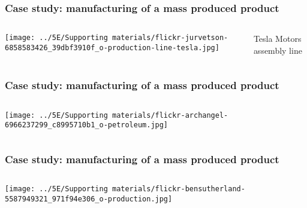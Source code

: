 
\begin{frame}\frametitle{Case study: manufacturing of a mass produced product}
	\begin{columns}[b]
				\centerline{\texttt{[image: ../5E/Supporting materials/flickr-jurvetson-6858583426\_39dbf3910f\_o-production-line-tesla.jpg]}}
			Tesla Motors assembly line
	\end{columns}
\end{frame}

\begin{frame}\frametitle{Case study: manufacturing of a mass produced product}
	\begin{columns}[b]
 				\centerline{\texttt{[image: ../5E/Supporting materials/flickr-archangel-6966237299\_c8995710b1\_o-petroleum.jpg]}}


	\end{columns}
\end{frame}
	
\begin{frame}\frametitle{Case study: manufacturing of a mass produced product}
	\begin{columns}[b]
				\centerline{\texttt{[image: ../5E/Supporting materials/flickr-bensutherland-5587949321\_971f94e306\_o-production.jpg]}}

	\end{columns}
\end{frame}

